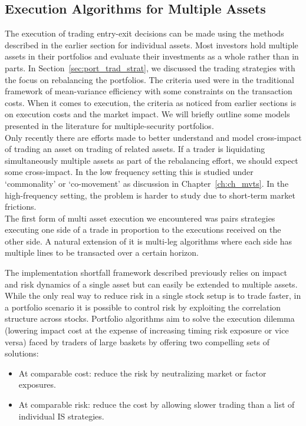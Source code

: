 \subsection{Execution Algorithms for Multiple Assets}


The execution of trading entry-exit decisions can be made using the methods described in the earlier section for individual assets. Most investors hold multiple assets in their portfolios and evaluate their investments as a whole rather than in parts. In Section~\ref{sec:port_trad_strat}, we discussed the trading strategies with the focus on rebalancing the portfolios. The criteria used were in the traditional framework of mean-variance efficiency with some constraints on the transaction costs. When it comes to execution, the criteria as noticed from earlier sections is on execution costs and the market impact. We will briefly outline some models presented in the literature for multiple-security portfolios.\\


Only recently there are efforts made to better understand and model cross-impact of trading an asset on trading of related assets. If a trader is liquidating simultaneously multiple assets as part of the rebalancing effort, we should expect some cross-impact. In the low frequency setting this is studied under `commonality' or `co-movement' as discussion in Chapter~\ref{ch:ch_mvts}. In the high-frequency setting, the problem is harder to study due to short-term market frictions. \\


The first form of multi asset execution we encountered was pairs strategies executing one side of a trade in proportion to the executions received on the other side. A natural extension of it is multi-leg algorithms where each side has multiple lines to be transacted over a certain horizon.

The implementation shortfall framework described previously relies on impact and risk dynamics of a single asset but can easily be extended to multiple assets. While the only real way to reduce risk in a single stock setup is to trade faster, in a portfolio scenario it is possible to control risk by exploiting the correlation structure across stocks. Portfolio algorithms aim to solve the execution dilemma (lowering impact cost at the expense of increasing timing risk exposure or vice versa) faced by traders of large baskets by offering two compelling sets of solutions:
\begin{itemize}
\item At comparable cost: reduce the risk by neutralizing market or factor exposures. 
\item At comparable risk: reduce the cost by allowing slower trading than a list of individual IS strategies.
\end{itemize}


